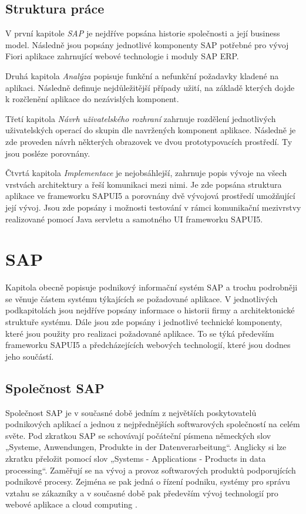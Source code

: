 \documentclass[thesis=M,czech]{FITthesis}[2012/06/26]
\begin{document}
\begin{introduction}
\section{Struktura práce}
V první kapitole \textit{SAP} je nejdříve popsána historie společnosti a její business model. Následně jsou popsány jednotlivé komponenty SAP potřebné pro vývoj Fiori aplikace zahrnující webové technologie i moduly SAP ERP. 

Druhá kapitola \textit{Analýza} popisuje funkční a nefunkční požadavky kladené na aplikaci. Následně definuje nejdůležitější případy užití, na základě kterých dojde k rozčlenění aplikace do nezávislých komponent. 

Třetí kapitola \textit{Návrh uživatelského rozhraní} zahrnuje rozdělení jednotlivých uživatelských operací do skupin dle navržených komponent aplikace. Následně je zde proveden návrh některých obrazovek ve dvou prototypovacích prostředí. Ty jsou posléze porovnány.

Čtvrtá kapitola \textit{Implementace} je nejobsáhlejší, zahrnuje popis vývoje na všech vrstvách architektury a řeší komunikaci mezi nimi. Je zde popsána struktura aplikace ve frameworku SAPUI5 a porovnány dvě vývojová prostředí umožňující její vývoj. Jsou zde popsány i možnosti testování v rámci komunikační mezivrstvy realizované pomocí Java servletu a samotného UI frameworku SAPUI5.
\end{introduction}

\chapter{SAP}
Kapitola obecně popisuje podnikový informační systém SAP a trochu podrobněji se věnuje částem systému týkajících se požadované aplikace. V jednotlivých podkapitolách jsou nejdříve popsány informace o historii firmy a architektonické struktuře systému. Dále jsou zde popsány i jednotlivé technické komponenty, které jsou použity pro realizaci požadované aplikace. To se týká především frameworku SAPUI5 a předcházejících webových technologií, které jsou dodnes jeho součástí.

\section{Společnost SAP}
Společnost SAP je v současné době jedním z největších poskytovatelů podnikových aplikací a jednou z nejpřednějších softwarových společností na celém světe. Pod zkratkou SAP se schovávají počáteční písmena německých slov „Systeme, Anwendungen, Produkte in der Datenverarbeitung“. Anglicky si lze zkratku přeložit pomocí slov „Systems - Applications - Products in data processing“. Zaměřují se na vývoj a provoz softwarových produktů podporujících podnikové procesy. Zejména se pak jedná o řízení podniku, systémy pro správu vztahu se zákazníky a v současné době pak především vývoj technologií pro webové aplikace a cloud computing \cite{sap_information}.
\end{document}
